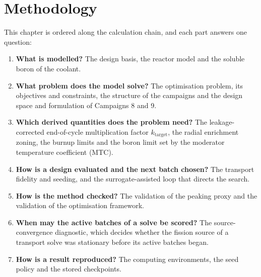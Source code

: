 
\usetikzlibrary{arrows.meta}
\providecommand{\openpoint}[1]{\par\noindent\fbox{\parbox{0.97\linewidth}{%
  \textbf{Open point:} #1}}\par}

\chapter{Methodology}
\label{ch:methodology}

This chapter is ordered along the calculation chain, and each part
answers one question:

\begin{enumerate}
  \item \textbf{What is modelled?} The design basis, the reactor model
        and the soluble boron of the coolant.

  \item \textbf{What problem does the model solve?} The optimisation problem,
        its objectives and constraints, the structure of the campaigns
        and the design space and formulation of Campaigns 8 and 9.

  \item \textbf{Which derived quantities does the problem need?} The
        leakage-corrected end-of-cycle multiplication factor $k_\mathrm{target}$, the radial enrichment
        zoning, the burnup limits and the boron limit set by
        the moderator temperature coefficient (MTC).

  \item \textbf{How is a design evaluated and the next batch
        chosen?} The transport fidelity and seeding, and the
        surrogate-assisted loop that directs the search.

  \item \textbf{How is the method checked?} The validation of the
        peaking proxy and the validation of the optimisation framework.

  \item \textbf{When may the active batches of a solve be scored?}
        The source-convergence diagnostic, which decides whether the
        fission source of a transport solve was stationary before its
        active batches began.

  \item \textbf{How is a result reproduced?} The computing
        environments, the seed policy and the stored checkpoints.
\end{enumerate}

